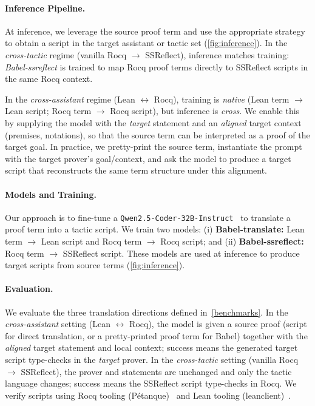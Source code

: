 \documentclass{article}
\theoremstyle{plain}
\theoremstyle{definition}
\theoremstyle{remark}
\begin{document}
	\paragraph{Inference Pipeline.}
	At inference, we leverage the source proof term and use the appropriate strategy to obtain a script in the target assistant or tactic set (\cref{fig:inference}).
	In the \emph{cross-tactic} regime (vanilla Rocq $\to$ SSReflect), inference matches training: \textit{Babel-ssreflect} is trained to map Rocq proof terms directly to SSReflect scripts in the same Rocq context.
	
	In the \emph{cross-assistant} regime (Lean $\leftrightarrow$ Rocq), training is \emph{native} (Lean term $\to$ Lean script; Rocq term $\to$ Rocq script), but inference is \emph{cross}.
	We enable this by supplying the model with the \emph{target} statement and an \emph{aligned} target context (premises, notations), so that the source term can be interpreted as a proof of the target goal.
	In practice, we pretty-print the source term, instantiate the prompt with the target prover's goal/context, and ask the model to produce a target script that reconstructs the same term structure under this alignment.	
	
	\paragraph{Models and Training.}
	Our approach is to fine-tune a \texttt{Qwen2.5-Coder-32B-Instruct}~\cite{deepseek2024} to translate a proof term into a tactic script. We train two models:
	(i) \textbf{Babel-translate:} Lean term $\to$ Lean script and Rocq term $\to$ Rocq script; and
	(ii) \textbf{Babel-ssreflect:} Rocq term $\to$ SSReflect script.
	These models are used at inference to produce target scripts from source terms (\cref{fig:inference}).
	
	\paragraph{Evaluation.}
	We evaluate the three translation directions defined in~\cref{benchmarks}.
	In the \emph{cross-assistant} setting (Lean $\leftrightarrow$ Rocq), the model is given a source proof (script for direct translation, or a pretty-printed proof term for Babel) together with the \emph{aligned} target statement and local context; success means the generated target script type-checks in the \emph{target} prover.
	In the \emph{cross-tactic} setting (vanilla Rocq $\to$ SSReflect), the prover and statements are unchanged and only the tactic language changes; success means the SSReflect script type-checks in Rocq.
	We verify scripts using Rocq tooling (Pétanque)~\cite{coqlsp,nlir-mathai24} and Lean tooling (leanclient)~\cite{leanclient2025}.
	
\end{document}
